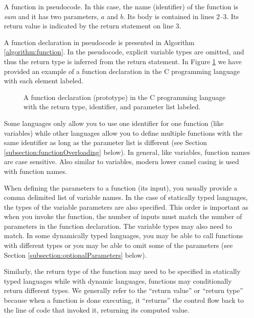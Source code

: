 \begin{algorithm}[H]
\caption[A function in pseudocode]{A function in pseudocode.  In this case, the name (identifier) of
the function is \emph{sum} and it has two parameters, $a$ and $b$.  Its
body is contained in lines 2--3.  Its return value is indicated by the return
statement on line 3.}
\label{algorithm:function}
\end{algorithm}

A function declaration in pseudocode is presented in Algorithm 
\ref{algorithm:function}.  In the pseudocode, explicit variable types
are omitted, and thus the return type is inferred from the return statement.
In Figure \ref{figure:cFunctionPrototype} we have provided an example
of a function declaration in the C programming language with each
element labeled. 

\begin{figure}[H]
\centering

\caption{A function declaration (prototype) in the C programming language
with the return type, identifier, and parameter list labeled.}
\label{figure:cFunctionPrototype}
\end{figure}

Some languages only allow you to use one identifier for one function 
(like variables) while other languages allow you to define multiple functions
with the same identifier as long as the parameter list is different (see
Section \ref{subsection:functionOverloading} below).  In general, like variables, function names
are case sensitive.  Also similar to variables, modern lower camel casing
is used with function names.  

When defining the parameters to a function (its input), you usually provide
a comma delimited list of variable names.  In the case of statically typed
languages, the types of the variable parameters are also specified.  This
order is important as when you invoke the function, the number of inputs
must match the number of parameters in the function declaration.  The 
variable types may also need to match.  In some dynamically typed languages, 
you may be able to call functions with different types or you may be able
to omit some of the parameters (see Section \ref{subsection:optionalParameters}
below).

Similarly, the return type of the function may need to be specified in 
statically typed languages while with dynamic languages, functions may
conditionally return different types.  We generally refer to the ``return value''
or ``return type'' because when a function is done executing, it ``returns''
the control flow back to the line of code that invoked it, returning its
computed value.

